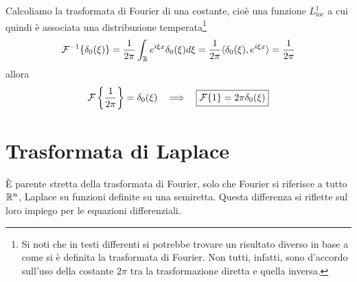 Calcoliamo la trasformata di Fourier di una costante, cioè una funzione $L^{1}_{\mathrm{loc}}$ a cui quindi è associata una distribuzione temperata\footnote{Si noti che in testi differenti si potrebbe trovare un risultato diverso in base a come si è definita la trasformata di Fourier. Non tutti, infatti, sono d'accordo sull'uso della costante $2\pi $ tra la trasformazione diretta e quella inversa.}
\begin{equation*}
\mathcal{F}^{- 1}\{\delta_{0}(\xi)\} = \frac{1}{2\pi}\int_{\mathbb{R}} e^{i\xi x} \delta_{0}(\xi) d\xi = \frac{1}{2\pi} \langle \delta_{0}(\xi), e^{i\xi x} \rangle = \frac{1}{2\pi}
\end{equation*}
allora
\begin{equation*}
\mathcal{F}\left\{\frac{1}{2\pi}\right\} = \delta_{0}(\xi) \ \ \implies \ \ \boxed{\mathcal{F}\{1\} = 2\pi \delta_{0}(\xi)}
\end{equation*}

\section{Trasformata di Laplace}

È parente stretta della trasformata di Fourier, solo che Fourier si riferisce a tutto $\mathbb{R}^{n}$, Laplace su funzioni definite su una semiretta. Questa differenza si riflette sul loro impiego per le equazioni differenziali.


